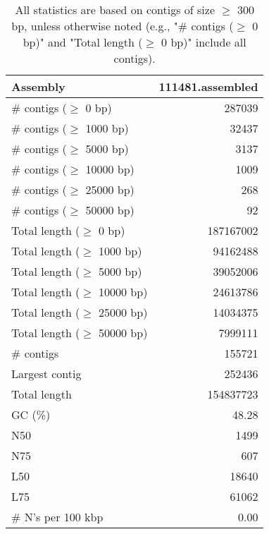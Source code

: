 \documentclass[12pt,a4paper]{article}
\begin{document}
\begin{table}[ht]
\begin{center}
\caption{All statistics are based on contigs of size $\geq$ 300 bp, unless otherwise noted (e.g., "\# contigs ($\geq$ 0 bp)" and "Total length ($\geq$ 0 bp)" include all contigs).}
\begin{tabular}{|l*{1}{|r}|}
\hline
Assembly & 111481.assembled \\ \hline
\# contigs ($\geq$ 0 bp) & 287039 \\ \hline
\# contigs ($\geq$ 1000 bp) & 32437 \\ \hline
\# contigs ($\geq$ 5000 bp) & 3137 \\ \hline
\# contigs ($\geq$ 10000 bp) & 1009 \\ \hline
\# contigs ($\geq$ 25000 bp) & 268 \\ \hline
\# contigs ($\geq$ 50000 bp) & 92 \\ \hline
Total length ($\geq$ 0 bp) & 187167002 \\ \hline
Total length ($\geq$ 1000 bp) & 94162488 \\ \hline
Total length ($\geq$ 5000 bp) & 39052006 \\ \hline
Total length ($\geq$ 10000 bp) & 24613786 \\ \hline
Total length ($\geq$ 25000 bp) & 14034375 \\ \hline
Total length ($\geq$ 50000 bp) & 7999111 \\ \hline
\# contigs & 155721 \\ \hline
Largest contig & 252436 \\ \hline
Total length & 154837723 \\ \hline
GC (\%) & 48.28 \\ \hline
N50 & 1499 \\ \hline
N75 & 607 \\ \hline
L50 & 18640 \\ \hline
L75 & 61062 \\ \hline
\# N's per 100 kbp & 0.00 \\ \hline
\end{tabular}
\end{center}
\end{table}
\end{document}
